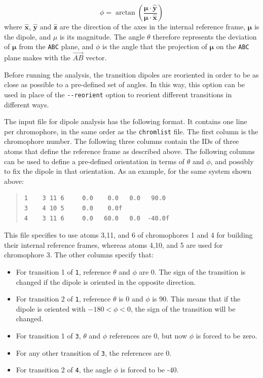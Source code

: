 \documentclass[a4paper,11pt]{article}
\newcommand{\bs}{\boldsymbol}
\begin{document}
\begin{equation}\label{eq:defphi}
 \phi = \arctan\left(\dfrac{\bs{\mu}\cdot\hat{\mathbf{y}}}{\bs{\mu}\cdot\hat{\mathbf{x}}}\right)
\end{equation}
where $\hat{\mathbf{x}}$, $\hat{\mathbf{y}}$ and $\hat{\mathbf{z}}$ are the direction of the axes in the internal reference frame, $\bs{\mu}$ is the dipole, and $\mu$ is its magnitude. The angle $\theta$ therefore represents the deviation of $\bs{\mu}$ from the \texttt{ABC} plane, and $\phi$ is the angle that the projection of $\bs{\mu}$ on the \texttt{ABC} plane makes with the $\vec{AB}$ vector. 

Before running the analysis, the transition dipoles are reoriented in order to be as close as possible to a pre-defined set of angles. In this way, this option can be used in place of the \texttt{-{}-reorient} option to reorient different transitions in different ways.

The input file for dipole analysis has the following format. It contains one line per chromophore, in the same order as the \texttt{chromlist} file. The first column is the chromophore number. The following three columns contain the IDs of three atoms that define the reference frame as described above. The following columns can be used to define a pre-defined orientation in terms of $\theta$ and $\phi$, and possibly to fix the dipole in that orientation. As an example, for the same system shown above: 

\begin{framed}
\begin{quote}
\begin{verbatim}
1    3 11 6     0.0    0.0   0.0   90.0
3    4 10 5     0.0    0.0f 
4    3 11 6     0.0   60.0   0.0  -40.0f
\end{verbatim}
\end{quote}
\end{framed}

This file specifies to use atoms 3,11, and 6 of chromophores 1 and 4 for building their internal reference frames, whereas atoms 4,10, and 5 are used for chromophore 3. 
The other columns specify that:
\begin{itemize}
\item For transition 1 of \texttt{1}, reference $\theta$ and $\phi$ are 0. The sign of the transition is changed if the dipole is oriented in the opposite direction.
\item For transition 2 of \texttt{1}, reference $\theta$ is 0 and $\phi$ is 90. This means that if the dipole is oriented with $-180 < \phi < 0$, the sign of the transition will be changed.
\item For transition 1 of \texttt{3}, $\theta$ and $\phi$ references are 0, but now $\phi$ is forced to be zero.
\item For any other transition of \texttt{3}, the references are 0.
\item For transition 2 of \texttt{4}, the angle $\phi$ is forced to be -40.
\end{itemize}
\end{document}

